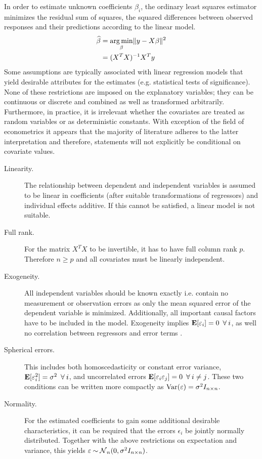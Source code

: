 In order to estimate unknown coefficients $\beta_i$, the ordinary least squares estimator minimizes the residual sum of squares, the squared differences between observed responses and their predictions according to the linear model.
\begin{subequations}
\begin{align}
  \widehat{\beta} &= \operatorname*{arg\, min}_{\beta} \lVert y - X \beta\rVert^2 \\
         &= (X^T X)^{-1} X^T y \label{eq:ols-estimate}
\end{align}
\end{subequations}
Some assumptions are typically associated with linear regression models that yield desirable attributes for the estimates (e.g. statistical tests of significance). None of these restrictions are imposed on the explanatory variables; they can be continuous or discrete and combined as well as transformed arbitrarily. Furthermore, in practice, it is irrelevant whether the covariates are treated as random variables or as deterministic constants. With exception of the field of econometrics it appears that the majority of literature adheres to the latter interpretation and therefore, statements will not explicitly be conditional on covariate values.
\begin{description}
  \item[Linearity.] The relationship between dependent and independent variables is assumed to be linear in coefficients (after suitable transformations of regressors) and individual effects additive. If this cannot be satisfied, a linear model is not suitable.
  \item[Full rank.] For the matrix $X^T X$ to be invertible, it has to have full column rank $p$. Therefore $n \geq p$ and all covariates must be linearly independent.
  \item[Exogeneity.] All independent variables should be known exactly i.e. contain no measurement or observation errors as only the mean squared error of the dependent variable is minimized. Additionally, all important causal factors have to be included in the model. Exogeneity implies $\Erw[\epsilon_i] = 0 \forall i$, as well no correlation between regressors and error terms \citep{Hayashi2000}.
  \item[Spherical errors.] This includes both homoscedasticity or constant error variance, $\Erw[\epsilon_i^2] = \sigma^2 \forall i$, and uncorrelated errors $\Erw[\epsilon_i \epsilon_j] = 0 \forall i \neq j$. These two conditions can be written more compactly as $\operatorname{Var}(\varepsilon) = \sigma^2I_{n \times n}$.
  \item[Normality.] For the estimated coefficients to gain some additional desirable characteristics, it can be required that the errors $\epsilon_i$ be jointly normally distributed. Together with the above restrictions on expectation and variance, this yields $\varepsilon \mathbin{\sim} \operatorname{\mathcal{N}}_n(0, \sigma^2 I_{n \times n})$.
\end{description}

